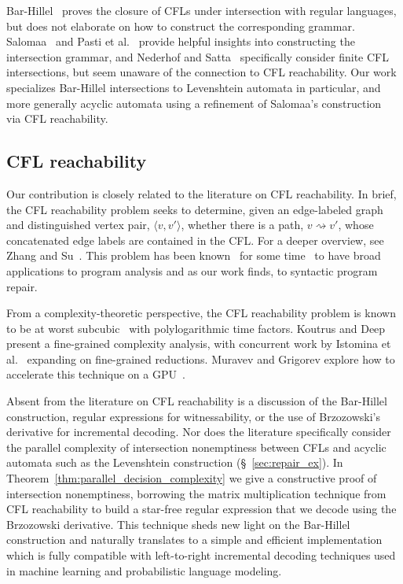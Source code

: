 \documentclass[sigplan,review,acmsmall,nonacm,screen,anonymous]{acmart}\settopmatter{printfolios=false,printccs=false,printacmref=false}
\begin{document}
Bar-Hillel~\cite{bar1961formal} proves the closure of CFLs under intersection with regular languages, but does not elaborate on how to construct the corresponding grammar. Salomaa~\cite{salomaa1973formal} and Pasti et al.~\cite{pasti2023intersection} provide helpful insights into constructing the intersection grammar, and Nederhof and Satta~\cite{nederhof2004language} specifically consider finite CFL intersections, but seem unaware of the connection to CFL reachability. Our work specializes Bar-Hillel intersections to Levenshtein automata in particular, and more generally acyclic automata using a refinement of Salomaa's construction~\cite{salomaa1973formal} via CFL reachability.

\subsection{CFL reachability}

Our contribution is closely related to the literature on CFL reachability. In brief, the CFL reachability problem seeks to determine, given an edge-labeled graph and distinguished vertex pair, $\langle v, v' \rangle$, whether there is a path, $v \rightsquigarrow v'$, whose concatenated edge labels are contained in the CFL. For a deeper overview, see Zhang and Su~\cite{zhang2017context}. This problem has been known~\cite{reps1998program} for some time~\cite{kodumal2004set} to have broad applications to program analysis and as our work finds, to syntactic program repair.

From a complexity-theoretic perspective, the CFL reachability problem is known to be at worst subcubic~\cite{chistikov2022subcubic} with polylogarithmic time factors. Koutrus and Deep~\cite{koutris2023fine} present a fine-grained complexity analysis, with concurrent work by Istomina et al.~\cite{istomina2023fine} expanding on fine-grained reductions. Muravev and Grigorev explore how to accelerate this technique on a GPU~\cite{muravev2025universal}.

Absent from the literature on CFL reachability is a discussion of the Bar-Hillel construction, regular expressions for witnessability, or the use of Brzozowski's derivative for incremental decoding. Nor does the literature specifically consider the parallel complexity of intersection nonemptiness between CFLs and acyclic automata such as the Levenshtein construction (\S~\ref{sec:repair_ex}). In Theorem~\ref{thm:parallel_decision_complexity} we give a constructive proof of intersection nonemptiness, borrowing the matrix multiplication technique from CFL reachability to build a star-free regular expression that we decode using the Brzozowski derivative. This technique sheds new light on the Bar-Hillel construction and naturally translates to a simple and efficient implementation which is fully compatible with left-to-right incremental decoding techniques used in machine learning and probabilistic language modeling.
\end{document}
